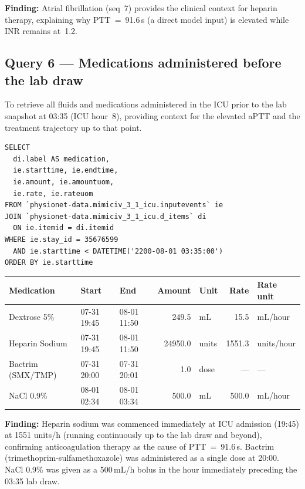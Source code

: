 \documentclass[12pt, a4paper]{article}
\begin{document}
\noindent\textbf{Finding:} Atrial fibrillation (seq~7) provides the clinical context for
heparin therapy, explaining why PTT~=~91.6\,s (a direct model input) is
elevated while INR remains at~1.2.

\subsection*{Query 6 --- Medications administered before the lab draw}

To retrieve all fluids and medications administered in the ICU prior to the
lab snapshot at 03:35 (ICU hour~8), providing context for the elevated aPTT
and the treatment trajectory up to that point.

\begin{lstlisting}[style=sql]
SELECT
  di.label AS medication,
  ie.starttime, ie.endtime,
  ie.amount, ie.amountuom,
  ie.rate, ie.rateuom
FROM `physionet-data.mimiciv_3_1_icu.inputevents` ie
JOIN `physionet-data.mimiciv_3_1_icu.d_items` di
  ON ie.itemid = di.itemid
WHERE ie.stay_id = 35676599
  AND ie.starttime < DATETIME('2200-08-01 03:35:00')
ORDER BY ie.starttime
\end{lstlisting}

\medskip
{\scriptsize\setlength{\tabcolsep}{3pt}
\begin{tabular}{p{2.8cm} l l r l r l}
\toprule
\textbf{Medication} & \textbf{Start} & \textbf{End} & \textbf{Amount} & \textbf{Unit} & \textbf{Rate} & \textbf{Rate unit} \\
\midrule
Dextrose 5\%      & 07-31 19:45 & 08-01 11:50 & 249.5   & mL    & 15.5    & mL/hour \\
Heparin Sodium    & 07-31 19:45 & 08-01 11:50 & 24950.0 & units & 1551.3  & units/hour \\
Bactrim (SMX/TMP) & 07-31 20:00 & 07-31 20:01 & 1.0     & dose  & ---     & --- \\
NaCl 0.9\%        & 08-01 02:34 & 08-01 03:34 & 500.0   & mL    & 500.0   & mL/hour \\
\bottomrule
\end{tabular}
}

\noindent\textbf{Finding:} Heparin sodium was commenced immediately at ICU admission
(19:45) at 1551 units/h (running continuously up to the lab draw and beyond),
confirming anticoagulation therapy as the cause of PTT~=~91.6\,s. Bactrim
(trimethoprim-sulfamethoxazole) was administered as a single dose at 20:00.
NaCl 0.9\% was given as a 500\,mL/h bolus in the hour immediately preceding
the 03:35 lab draw.
\end{document}
